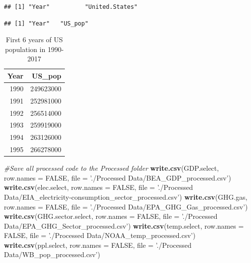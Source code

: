 \documentclass[12pt,]{article}
\newenvironment{Shaded}{\begin{snugshade}}{\end{snugshade}}
\newcommand{\KeywordTok}[1]{\textcolor[rgb]{0.13,0.29,0.53}{\textbf{#1}}}
\newcommand{\DataTypeTok}[1]{\textcolor[rgb]{0.13,0.29,0.53}{#1}}
\newcommand{\StringTok}[1]{\textcolor[rgb]{0.31,0.60,0.02}{#1}}
\newcommand{\CommentTok}[1]{\textcolor[rgb]{0.56,0.35,0.01}{\textit{#1}}}
\newcommand{\OtherTok}[1]{\textcolor[rgb]{0.56,0.35,0.01}{#1}}
\newcommand{\OperatorTok}[1]{\textcolor[rgb]{0.81,0.36,0.00}{\textbf{#1}}}
\newcommand{\NormalTok}[1]{#1}
\begin{document}
\begin{verbatim}
## [1] "Year"          "United.States"
\end{verbatim}

\begin{Shaded}
\end{Shaded}

\begin{verbatim}
## [1] "Year"   "US_pop"
\end{verbatim}

\begin{table}[!h]

\caption{\label{tab:unnamed-chunk-15}First 6 years of US population in 1990-2017}
\centering
\begin{tabular}{r|r}
\hline
Year & US\_pop\\
\hline
1990 & 249623000\\
\hline
1991 & 252981000\\
\hline
1992 & 256514000\\
\hline
1993 & 259919000\\
\hline
1994 & 263126000\\
\hline
1995 & 266278000\\
\hline
\end{tabular}
\end{table}

\begin{Shaded}
\begin{Highlighting}[]
\CommentTok{#Save all processed code to the Processed folder}
\KeywordTok{write.csv}\NormalTok{(GDP.select, }\DataTypeTok{row.names =} \OtherTok{FALSE}\NormalTok{, }\DataTypeTok{file =} \StringTok{'./Processed Data/BEA_GDP_processed.csv'}\NormalTok{)}
\KeywordTok{write.csv}\NormalTok{(elec.select, }\DataTypeTok{row.names =} \OtherTok{FALSE}\NormalTok{, }\DataTypeTok{file =} \StringTok{'./Processed Data/EIA_electricity-consumption_sector_processed.csv'}\NormalTok{)}
\KeywordTok{write.csv}\NormalTok{(GHG.gas, }\DataTypeTok{row.names =} \OtherTok{FALSE}\NormalTok{, }\DataTypeTok{file =} \StringTok{'./Processed Data/EPA_GHG_Gas_processed.csv'}\NormalTok{)}
\KeywordTok{write.csv}\NormalTok{(GHG.sector.select, }\DataTypeTok{row.names =} \OtherTok{FALSE}\NormalTok{, }\DataTypeTok{file =} \StringTok{'./Processed Data/EPA_GHG_Sector_processed.csv'}\NormalTok{)}
\KeywordTok{write.csv}\NormalTok{(temp.select, }\DataTypeTok{row.names =} \OtherTok{FALSE}\NormalTok{, }\DataTypeTok{file =} \StringTok{'./Processed Data/NOAA_temp_processed.csv'}\NormalTok{)}
\KeywordTok{write.csv}\NormalTok{(ppl.select, }\DataTypeTok{row.names =} \OtherTok{FALSE}\NormalTok{, }\DataTypeTok{file =} \StringTok{'./Processed Data/WB_pop_processed.csv'}\NormalTok{)}
\end{Highlighting}
\end{Shaded}
\end{document}
